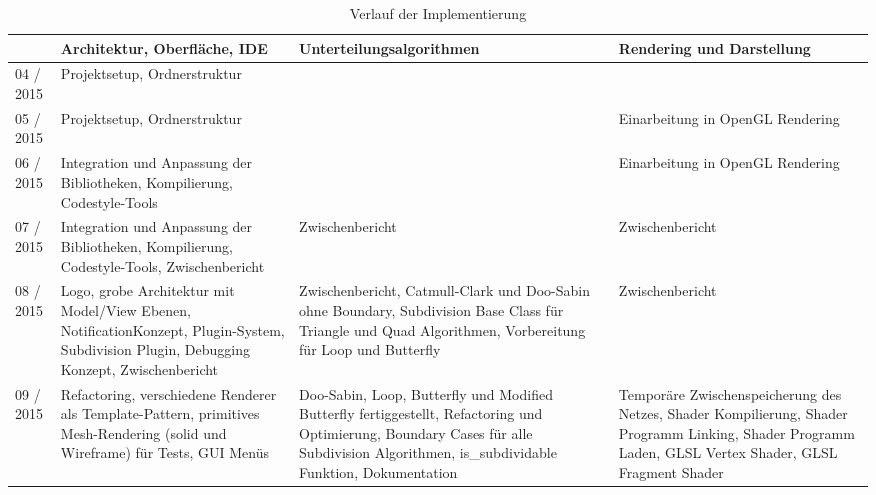 \begin{table}[]
\vspace*{-40mm}

\center
\caption{Verlauf der Implementierung}

\hspace*{-24mm}
\begin{tabular}{p{1.6cm}|p{5cm}|p{5cm}|p{5cm}}		  
		  & Architektur, Oberfläche, IDE
      	  & Unterteilungsalgorithmen
      	  & Rendering und Darstellung
      	  \\
    	  
\hline
\hline
          
04 / 2015 & Projektsetup, Ordnerstruktur 
          & 
          &
      	  \\
         
\hline

05 / 2015 & Projektsetup, Ordnerstruktur
		  & 
		  & Einarbeitung in OpenGL Rendering
		  \\
		  
\hline

06 / 2015 & Integration und Anpassung
			der Bibliotheken, Kompilierung,
			Codestyle-Tools
		  &
		  & Einarbeitung in OpenGL Rendering
		  \\
		  
\hline

07 / 2015 & Integration und Anpassung
			der Bibliotheken, Kompilierung,
			Codestyle-Tools, Zwischenbericht
		  & Zwischenbericht
		  & Zwischenbericht
		  \\
		  
\hline

08 / 2015 & Logo, grobe Architektur mit
			Model/View Ebenen,
			NotificationKonzept, Plugin-System,
			Subdivision Plugin, Debugging Konzept, Zwischenbericht
          & Zwischenbericht, Catmull-Clark und Doo-Sabin ohne Boundary,
			Subdivision Base Class für Triangle und Quad Algorithmen,
			Vorbereitung für Loop und Butterfly
          & Zwischenbericht
          \\
          
\hline

09 / 2015 & Refactoring, verschiedene Renderer
			als Template-Pattern, primitives
			Mesh-Rendering (solid und Wireframe)
			für Tests, GUI Menüs
		  & Doo-Sabin, Loop, Butterfly und Modified Butterfly fertiggestellt,
		  	Refactoring und Optimierung, Boundary Cases für alle Subdivision Algorithmen,
		  	is\_subdividable Funktion, Dokumentation
		  & Temporäre Zwischenspeicherung des Netzes,
		  	Shader Kompilierung, Shader Programm Linking,
		  	Shader Programm Laden, GLSL Vertex Shader,
		  	GLSL Fragment Shader
		  \\
		  

\end{tabular}
\end{table}
